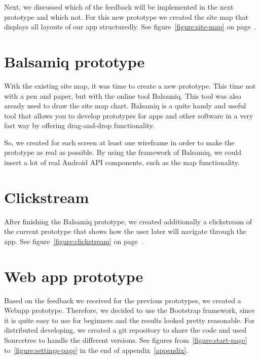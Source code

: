 \documentclass[11pt,twoside,a4paper]{report}
\begin{document}
Next, we discussed which of the feedback will be implemented in the next prototype and which not. For this new prototype we created the site map that displays all layouts of our app structuredly. See figure~\ref{figure:site-map} on page~\pageref{figure:site-map}.

\section{Balsamiq prototype}

With the existing site map, it was time to create a new prototype. This time not with a pen and paper, but with the online tool Balsamiq. This tool was also aready used to draw the site map chart. Balsamiq is a quite handy and useful tool that allows you to develop prototypes for apps and other software in a very fast way by oﬀering drag-and-drop functionality.

So, we created for each screen at least one wireframe in order to make the prototype as real as possible. By using the framework of Balsamiq, we could
insert a lot of real Android API components, such as the map functionality.

\section{Clickstream}

After finishing the Balsamiq prototype, we created additionally a clickstream of the current prototype that shows how the user later will navigate through the app. See figure~\ref{figure:clickstream} on page~\pageref{figure:clickstream}.

\section{Web app prototype}

Based on the feedback we received for the previous prototypes, we created a Webapp prototype. Therefore, we decided to use the Bootstrap framework, since it is quite easy to use for beginners and the results looked pretty reasonable. For distributed developing, we created a git repository to share the code and used Sourcetree to handle the different versions. See figures from~\ref{figure:start-page} to~\ref{figure:settings-page} in the end of appendix~\ref{appendix}.
\end{document}
